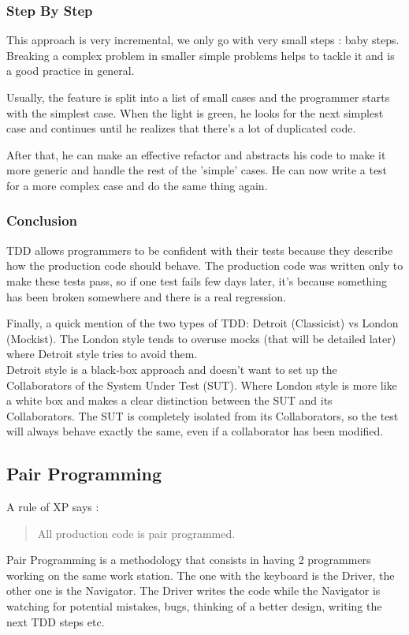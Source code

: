 \subsubsection{Step By Step}
This approach is very incremental, we only go with very small steps :
baby steps.
Breaking a complex problem in smaller simple problems helps to tackle it
and is a good practice in general.

Usually, the feature is split into a list of small cases and the
programmer starts with the simplest case.
When the light is green, he looks for the next simplest case and
continues until he realizes that there's a lot of duplicated code.

After that, he can make an effective refactor and abstracts his code to
make it more generic and handle the rest of the 'simple' cases.
He can now write a test for a more complex case and do the same thing
again.

\subsubsection{Conclusion}
TDD allows programmers to be confident with their tests because they
describe how the production code should behave.
The production code was written only to make these tests pass, so if
one test fails few days later, it's because something has been broken
somewhere and there is a real regression.

Finally, a quick mention of the two types of TDD: Detroit (Classicist)
vs London (Mockist).
The London style tends to overuse mocks (that will be detailed later)
where Detroit style tries to avoid them. \\
Detroit style is a black-box approach and doesn't want to set up the
Collaborators of the System Under Test (SUT).
Where London style is more like a white box and makes a clear distinction
between the SUT and its Collaborators.
The SUT is completely isolated from its Collaborators, so the test will
always behave exactly the same, even if a collaborator has been modified.

\subsection{Pair Programming}\label{subsec:pair-programming}
A rule of XP says :
\begin{quotation}
    All production code is pair programmed.
\end{quotation}
Pair Programming is a methodology that consists in having 2 programmers
working on the same work station.
The one with the keyboard is the Driver, the other one is the Navigator.
The Driver writes the code while the Navigator is watching for potential
mistakes, bugs, thinking of a better design, writing the next TDD steps
etc.

